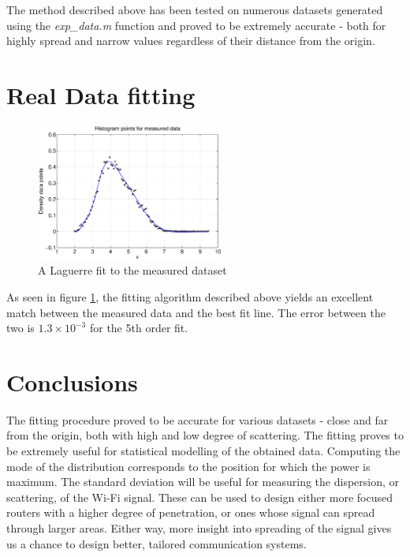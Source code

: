 \documentclass[a4paper]{article}
\numberwithin{equation}{section}
\begin{document}
\noindent The method described above has been tested on numerous datasets generated using the \textit{exp\_data.m} function and proved to be extremely accurate - both for highly spread and narrow values regardless of their distance from the origin.

\section{Real Data fitting}

\begin{figure}[!h]
\centering
\includegraphics[width=0.55\textwidth]{real_data_fit.eps}
\caption{\label{fig:realdataset}A Laguerre fit to the measured dataset}
\end{figure}

\noindent As seen in figure \ref{fig:realdataset}, the fitting algorithm described above yields an excellent match between the measured data and the best fit line. The error between the two is $1.3 \times 10^{-3}$ for the 5th order fit.

\section{Conclusions}
The fitting procedure proved to be accurate for various datasets - close and far from the origin, both with high and low degree of scattering. The fitting proves to be extremely useful for statistical modelling of the obtained data. Computing the mode of the distribution corresponds to the position for which the power is maximum. The standard deviation will be useful for measuring the dispersion, or scattering, of the Wi-Fi signal. These can be used to design either more focused routers with a higher degree of penetration, or ones whose signal can spread through larger areas. Either way, more insight into spreading of the signal gives us a chance to design better, tailored communication systems.
\end{document}
